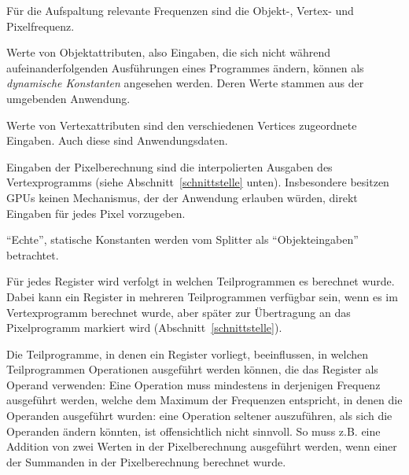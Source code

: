 \documentclass[twoside,a4paper,fleqn,12pt]{book}
\begin{document}
Für die Aufspaltung relevante Frequenzen sind die Objekt-, %
Vertex- und Pixelfrequenz.

Werte von Objektattributen, also Eingaben, die sich nicht während aufeinanderfolgenden Ausführungen eines Programmes
ändern, können als \emph{dynamische Konstanten} angesehen werden. Deren Werte stammen aus der umgebenden Anwendung.

Werte von Vertexattributen sind den verschiedenen Vertices zugeordnete Eingaben. %
Auch diese sind Anwendungsdaten.

Eingaben der Pixelberechnung sind die interpolierten Ausgaben des Vertexprogramms (siehe Abschnitt~\ref{schnittstelle} unten). 
Insbesondere besitzen GPUs keinen Mechanismus, der der Anwendung erlauben würden, direkt Eingaben für jedes Pixel
vorzugeben.

"`Echte"', statische Konstanten werden vom Splitter als "`Objekteingaben"' betrachtet.

Für jedes Register wird verfolgt in welchen Teilprogrammen es berechnet wurde.
Dabei kann ein Register in mehreren Teilprogrammen verfügbar sein, wenn es im Vertexprogramm berechnet wurde, aber später 
zur Übertragung an das Pixelprogramm markiert wird (Abschnitt~\ref{schnittstelle}).


Die Teilprogramme, in denen ein Register vorliegt, beeinflussen, in welchen Teilprogrammen Operationen ausgeführt werden können,
die das Register als Operand verwenden: Eine Operation muss mindestens in derjenigen Frequenz ausgeführt werden, welche dem Maximum der Frequenzen
entspricht, in denen die Operanden ausgeführt wurden: eine Operation seltener auszuführen, als sich die Operanden ändern könnten, ist offensichtlich nicht sinnvoll.
So muss z.B. eine Addition von zwei Werten in der Pixelberechnung ausgeführt werden, wenn einer der Summanden in der Pixelberechnung berechnet wurde.
\end{document}
